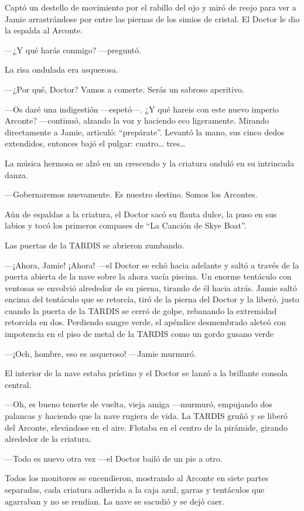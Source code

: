 Captó un destello de movimiento por el rabillo del ojo y miró de reojo
para ver a Jamie arrastrándose por entre las piernas de los simios de
cristal. El Doctor le dio la espalda al Arconte.

---¿Y qué harás conmigo? ---preguntó.

La risa ondulada era asquerosa. 

---¿Por qué, Doctor? Vamos a comerte. Serás un sabroso aperitivo.

---Os daré una indigestión ---espetó---. ¿Y qué hareis con este nuevo
imperio Arconte? ---continuó, alzando la voz y haciendo eco ligeramente.
Mirando directamente a Jamie, articuló: ``prepárate''. Levantó la mano,
sus cinco dedos extendidos, entonces bajó el pulgar: cuatro\ldots{}
tres\ldots{}

La música hermosa se alzó en un crescendo y la criatura onduló en su
intrincada danza. 

---Gobernaremos nuevamente. Es nuestro destino. Somos los Arcontes.

Aún de espaldas a la criatura, el Doctor sacó su flauta dulce, la puso
en sus labios y tocó los primeros compases de ``La Canción de Skye
Boat''.

Las puertas de la TARDIS se abrieron zumbando.

---¡Ahora, Jamie! ¡Ahora! ---el Doctor se echó hacia adelante y saltó a
través de la puerta abierta de la nave sobre la ahora vacía piscina. Un
enorme tentáculo con ventosas se envolvió alrededor de su pierna,
tirando de él hacia atrás. Jamie saltó encima del tentáculo que se
retorcía, tiró de la pierna del Doctor y la liberó, justo cuando la
puerta de la TARDIS se cerró de golpe, rebanando la extremidad retorcida
en dos. Perdiendo sangre verde, el apéndice desmembrado aleteó con
impotencia en el piso de metal de la TARDIS como un gordo gusano verde

---¡Och, hombre, eso es asqueroso! ---Jamie murmuró.

El interior de la nave estaba prístino y el Doctor se lanzó a la
brillante consola central. 

---Oh, es bueno tenerte de vuelta, vieja amiga ---murmuró, empujando dos
palancas y haciendo que la nave rugiera de vida. La TARDIS gruñó y se
liberó del Arconte, elevándose en el aire. Flotaba en el centro de la
pirámide, girando alrededor de la criatura.

---Todo es nuevo otra vez ---el Doctor bailó de un pie a otro.

Todos los monitores se encendieron, mostrando al Arconte en siete partes
separadas, cada criatura adherida a la caja azul, garras y tentáculos
que agarraban y no se rendían. La nave se sacudió y se dejó caer.


